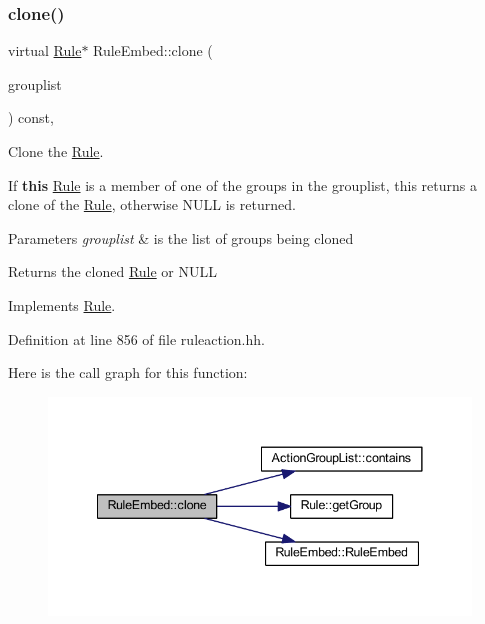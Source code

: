 \subsubsection{\texorpdfstring{clone()}{clone()}}
{\footnotesize\ttfamily virtual \mbox{\hyperlink{class_rule}{Rule}}$\ast$ Rule\+Embed\+::clone (\begin{DoxyParamCaption}\item[{const \mbox{\hyperlink{class_action_group_list}{Action\+Group\+List}} \&}]{grouplist }\end{DoxyParamCaption}) const\hspace{0.3cm}{\ttfamily [inline]}, {\ttfamily [virtual]}}



Clone the \mbox{\hyperlink{class_rule}{Rule}}. 

If {\bfseries{this}} \mbox{\hyperlink{class_rule}{Rule}} is a member of one of the groups in the grouplist, this returns a clone of the \mbox{\hyperlink{class_rule}{Rule}}, otherwise N\+U\+LL is returned. 
\begin{DoxyParams}{Parameters}
{\em grouplist} & is the list of groups being cloned \\
\hline
\end{DoxyParams}
\begin{DoxyReturn}{Returns}
the cloned \mbox{\hyperlink{class_rule}{Rule}} or N\+U\+LL 
\end{DoxyReturn}


Implements \mbox{\hyperlink{class_rule_a70de90a76461bfa7ea0b575ce3c11e4d}{Rule}}.



Definition at line 856 of file ruleaction.\+hh.

Here is the call graph for this function\+:
\nopagebreak
\begin{figure}[H]
\begin{center}
\leavevmode
\includegraphics[width=341pt]{class_rule_embed_a665557b4d2e8b6dead6e209a819ea134_cgraph}
\end{center}
\end{figure}
\mbox{\label{class_rule_embed_a3fd9cd36368a20aa7fd4d6b5c9b06ad2}} 
